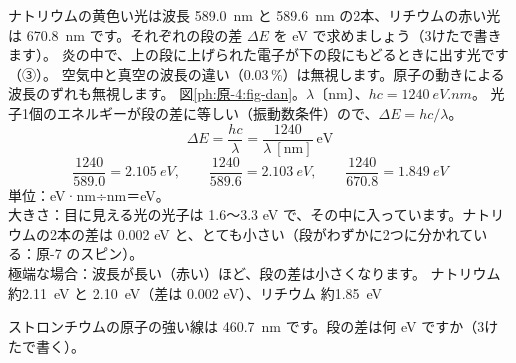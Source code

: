 \begin{kotoba}
\small
{}
\end{kotoba}

{}
{}

\label{ph:原-4:ex1}
\begin{phreidai}
ナトリウムの黄色い光は波長 \qty{589.0}{nm} と \qty{589.6}{nm} の2本、リチウムの赤い光は \qty{670.8}{nm} です。それぞれの段の差 $\Delta E$ を eV で求めましょう（3けたで書きます）。
\phbamen
炎の中で、上の段に上げられた電子が下の段にもどるときに出す光です（③）。
\phmushi
空気中と真空の波長の違い（0.03\,\%）は無視します。原子の動きによる波長のずれも無視します。
\phzu
図\ref{ph:原-4:fig-dan}。$\lambda$〔nm〕、$hc=\qty{1240}{eV.nm}$。
\phriyu
光子1個のエネルギーが段の差に等しい（振動数条件）ので、$\Delta E=hc/\lambda$。
\phtateru
\[ \Delta E=\frac{hc}{\lambda}=\frac{1240}{\lambda\ [\mathrm{nm}]}\ \mathrm{eV} \]
\phtoku
\[ \frac{1240}{589.0}=\qty{2.105}{eV},\qquad\frac{1240}{589.6}=\qty{2.103}{eV},\qquad\frac{1240}{670.8}=\qty{1.849}{eV} \]
\phtashikame
単位：eV·nm÷nm＝eV。\\
大きさ：目に見える光の光子は 1.6〜3.3 eV で、その中に入っています。ナトリウムの2本の差は 0.002 eV と、とても小さい（段がわずかに2つに分かれている：原-7 のスピン）。\\
極端な場合：波長が長い（赤い）ほど、段の差は小さくなります。
\kotae ナトリウム 約\qty{2.11}{eV} と \qty{2.10}{eV}（差は 0.002 eV）、リチウム 約\qty{1.85}{eV}
\end{phreidai}
\begin{jibun}
ストロンチウムの原子の強い線は \qty{460.7}{nm} です。段の差は何 eV ですか（3けたで書く）。
\end{jibun}

